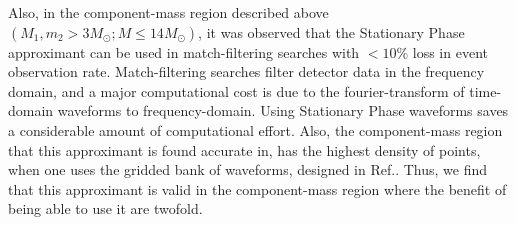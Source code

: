 \documentclass[aps,
prd,
amsmath,
amssymb,
twocolumn,
floatfix,
groupedaddress]{revtex4-1}
\begin{document}
Also, in the component-mass region described above $(M_1,m_2>3M_{\odot};M\leq 14M_{\odot})$, it was observed that the Stationary Phase approximant can be used in match-filtering searches with $<10\%$ loss in event observation rate. Match-filtering searches filter detector data in the frequency domain, and a major computational cost is due to the fourier-transform of time-domain waveforms to frequency-domain. Using Stationary Phase waveforms saves a considerable amount of computational effort. Also, the component-mass region that this approximant is found accurate in, has the highest density of points, when one uses the gridded bank of waveforms, designed in Ref.\citep{SathyaMetric2PN}. Thus, we find that this approximant is valid in the component-mass region where the benefit of being able to use it are twofold.


%


\end{document}
